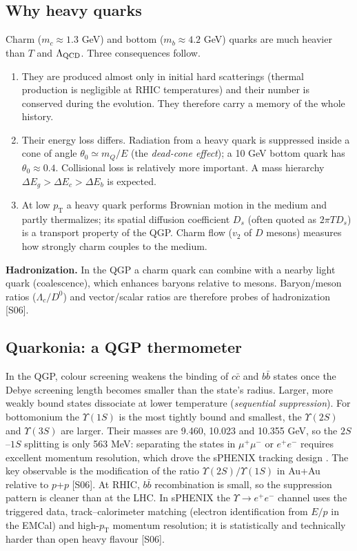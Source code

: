 \documentclass[11pt,letterpaper]{article}
\newcommand{\pT}{p_{\mathrm{T}}}
\begin{document}
\subsection{Why heavy quarks}
Charm ($m_c\approx1.3$ GeV) and bottom ($m_b\approx4.2$ GeV) quarks are much heavier than $T$ and $\Lambda_{\rm QCD}$.
Three consequences follow.
\begin{enumerate}
\item They are produced almost only in initial hard scatterings (thermal production is negligible at RHIC temperatures)
and their number is conserved during the evolution. They therefore carry a memory of the whole history.
\item Their energy loss differs. Radiation from a heavy quark is suppressed inside a cone of angle
$\theta_0\simeq m_Q/E$ (the \emph{dead-cone effect}); a 10 GeV bottom quark has $\theta_0\approx0.4$. Collisional loss
is relatively more important. A mass hierarchy $\Delta E_g>\Delta E_{c}>\Delta E_{b}$ is expected.
\item At low $\pT$ a heavy quark performs Brownian motion in the medium and partly thermalizes; its spatial diffusion
coefficient $D_s$ (often quoted as $2\pi T D_s$) is a transport property of the QGP. Charm flow ($v_2$ of $D$ mesons)
measures how strongly charm couples to the medium.
\end{enumerate}
\textbf{Hadronization.} In the QGP a charm quark can combine with a nearby light quark (coalescence), which enhances baryons
relative to mesons. Baryon/meson ratios ($\Lambda_c/D^0$) and vector/scalar ratios are therefore probes of hadronization
[S06].

\subsection{Quarkonia: a QGP thermometer}
In the QGP, colour screening weakens the binding of $c\bar c$ and $b\bar b$ states once the Debye screening length
becomes smaller than the state's radius. Larger, more weakly bound states dissociate at lower temperature
(\emph{sequential suppression}). For bottomonium the $\Upsilon(1S)$ is the most tightly bound and smallest, the
$\Upsilon(2S)$ and $\Upsilon(3S)$ are larger. Their masses are 9.460, 10.023 and 10.355 GeV, so the $2S$--$1S$ splitting is
only 563 MeV: separating the states in $\mu^+\mu^-$ or $e^+e^-$ requires excellent momentum resolution, which drove the
sPHENIX tracking design \cite{proposal}. The key observable is the modification of the ratio $\Upsilon(2S)/\Upsilon(1S)$
in Au+Au relative to $p$+$p$ [S06]. At RHIC, $b\bar b$ recombination is small, so the suppression pattern is cleaner than at the LHC.
In sPHENIX the $\Upsilon\to e^+e^-$ channel uses the triggered data, track--calorimeter matching (electron identification
from $E/p$ in the EMCal) and high-$\pT$ momentum resolution; it is statistically and technically harder than open heavy flavour [S06].
\end{document}
